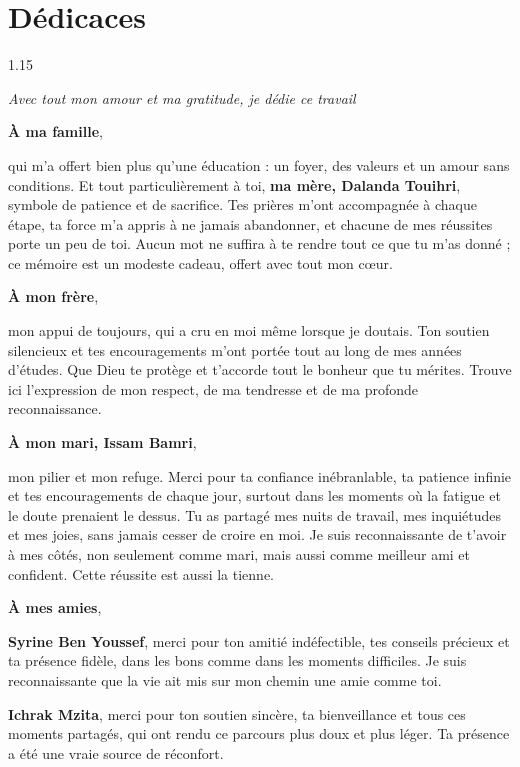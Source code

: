 \chapter*{Dédicaces}

\begin{spacing}{1.15}
\begin{center}

\textit{Avec tout mon amour et ma gratitude, je dédie ce travail}

\vskip0.35cm
\textbf{À ma famille},

qui m'a offert bien plus qu'une éducation : un foyer, des valeurs et un amour sans conditions. Et tout particulièrement à toi, \textbf{ma mère, Dalanda Touihri}, symbole de patience et de sacrifice. Tes prières m'ont accompagnée à chaque étape, ta force m'a appris à ne jamais abandonner, et chacune de mes réussites porte un peu de toi. Aucun mot ne suffira à te rendre tout ce que tu m'as donné ; ce mémoire est un modeste cadeau, offert avec tout mon cœur.

\vskip0.35cm
\textbf{À mon frère},

mon appui de toujours, qui a cru en moi même lorsque je doutais. Ton soutien silencieux et tes encouragements m'ont portée tout au long de mes années d'études. Que Dieu te protège et t'accorde tout le bonheur que tu mérites. Trouve ici l'expression de mon respect, de ma tendresse et de ma profonde reconnaissance.

\vskip0.35cm
\textbf{À mon mari, Issam Bamri},

mon pilier et mon refuge. Merci pour ta confiance inébranlable, ta patience infinie et tes encouragements de chaque jour, surtout dans les moments où la fatigue et le doute prenaient le dessus. Tu as partagé mes nuits de travail, mes inquiétudes et mes joies, sans jamais cesser de croire en moi. Je suis reconnaissante de t'avoir à mes côtés, non seulement comme mari, mais aussi comme meilleur ami et confident. Cette réussite est aussi la tienne.

\vskip0.35cm
\textbf{À mes amies},

\textbf{Syrine Ben Youssef}, merci pour ton amitié indéfectible, tes conseils précieux et ta présence fidèle, dans les bons comme dans les moments difficiles. Je suis reconnaissante que la vie ait mis sur mon chemin une amie comme toi.

\textbf{Ichrak Mzita}, merci pour ton soutien sincère, ta bienveillance et tous ces moments partagés, qui ont rendu ce parcours plus doux et plus léger. Ta présence a été une vraie source de réconfort.


\end{center}
\end{spacing}
